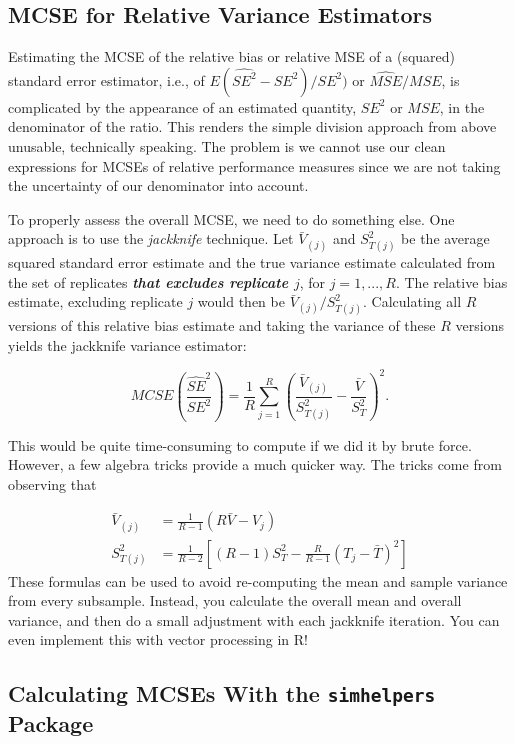 \documentclass[
]{book}
\begin{document}
\subsection{MCSE for Relative Variance Estimators}\label{mcse-for-relative-variance-estimators}

Estimating the MCSE of the relative bias or relative MSE of a (squared) standard error estimator, i.e., of \(E( \widehat{SE^2} - SE^2 ) / SE^2 )\) or \(\widehat{MSE} / MSE\), is complicated by the appearance of an estimated quantity, \(SE^2\) or \(MSE\), in the denominator of the ratio.
This renders the simple division approach from above unusable, technically speaking.
The problem is we cannot use our clean expressions for MCSEs of relative performance measures since we are not taking the uncertainty of our denominator into account.

To properly assess the overall MCSE, we need to do something else.
One approach is to use the \emph{jackknife} technique.
Let \(\bar{V}_{(j)}\) and \(S_{T(j)}^2\) be the average squared standard error estimate and the true variance estimate calculated from the set of replicates \textbf{\emph{that excludes replicate \(j\)}}, for \(j = 1,...,R\).
The relative bias estimate, excluding replicate \(j\) would then be \(\bar{V}_{(j)} / S_{T(j)}^2\).
Calculating all \(R\) versions of this relative bias estimate and taking the variance of these \(R\) versions yields the jackknife variance estimator:

\[
MCSE\left( \frac{ \widehat{SE}^2 }{SE^2} \right) = \frac{1}{R} \sum_{j=1}^R \left(\frac{\bar{V}_{(j)}}{S_{T(j)}^2} - \frac{\bar{V}}{S_T^2}\right)^2.
\]

This would be quite time-consuming to compute if we did it by brute force. However, a few algebra tricks provide a much quicker way. The tricks come from observing that

\[
\begin{aligned}
\bar{V}_{(j)} &= \frac{1}{R - 1}\left(R \bar{V} - V_j\right) \\
S_{T(j)}^2 &= \frac{1}{R - 2} \left[(R - 1) S_T^2 - \frac{R}{R - 1}\left(T_j - \bar{T}\right)^2\right]
\end{aligned}
\]
These formulas can be used to avoid re-computing the mean and sample variance from every subsample.
Instead, you calculate the overall mean and overall variance, and then do a small adjustment with each jackknife iteration.
You can even implement this with vector processing in R!

\subsection{\texorpdfstring{Calculating MCSEs With the \texttt{simhelpers} Package}{Calculating MCSEs With the simhelpers Package}}\label{calculating-mcses-with-the-simhelpers-package}
\end{document}
